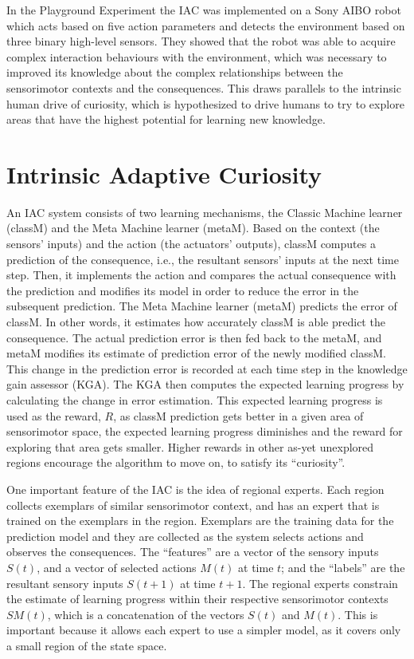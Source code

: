 In the Playground Experiment \cite{Oudeyer2005} the IAC was implemented on a Sony AIBO robot which acts based on five action parameters and detects the environment based on three binary high-level sensors. They showed that the robot was able to acquire complex interaction behaviours with the environment, which was necessary to improved its knowledge about the complex relationships between the sensorimotor contexts and the consequences. This draws parallels to the intrinsic human drive of curiosity, which is hypothesized to drive humans to try to explore areas that have the highest potential for learning new knowledge.
 
\section{Intrinsic Adaptive Curiosity}

An IAC system \cite{Oudeyer2007} consists of two learning mechanisms, the Classic Machine learner (classM) and the Meta Machine learner (metaM). Based on the context (the sensors' inputs) and the action (the actuators' outputs), classM computes a prediction of the consequence, i.e., the resultant sensors' inputs at the next time step. Then, it implements the action and compares the actual consequence with the prediction and modifies its model in order to reduce the error in the subsequent prediction. The Meta Machine learner (metaM) predicts the error of classM. In other words, it estimates how accurately classM is able predict the consequence. The actual prediction error is then fed back to the metaM, and metaM modifies its estimate of prediction error of the newly modified classM. This change in the prediction error is recorded at each time step in the knowledge gain assessor (KGA). The KGA then computes the expected learning progress by calculating the change in error estimation. This expected learning progress is used as the reward, $R$, as classM prediction gets better in a given area of sensorimotor space, the expected learning progress diminishes and the reward for exploring that area gets smaller. Higher rewards in other as-yet unexplored regions encourage the algorithm to move on, to satisfy its ``curiosity''. 

One important feature of the IAC is the idea of regional experts. Each region collects exemplars of similar sensorimotor context, and has an expert that is trained on the exemplars in the region. Exemplars are the training data for the prediction model and they are collected as the system selects actions and observes the consequences. The ``features'' are a vector of the sensory inputs $S(t)$, and a vector of selected actions $M(t)$ at time $t$; and the ``labels'' are the resultant sensory inputs $S(t+1)$ at time $t+1$. The regional experts constrain the estimate of learning progress within their respective sensorimotor contexts $SM(t)$, which is a concatenation of the vectors $S(t)$ and $M(t)$. This is important because it allows each expert to use a simpler model, as it covers only a small region of the state space.  

